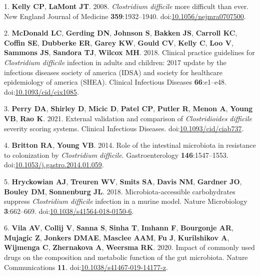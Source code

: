 \documentclass[
  12pt,
]{article}
\newenvironment{cslreferences}%
  {}%
  {\par}
\begin{document}
\hypertarget{refs}{}
\begin{cslreferences}
\leavevmode\hypertarget{ref-Kelly2008}{}%
1. \textbf{Kelly CP}, \textbf{LaMont JT}. 2008. \emph{Clostridium
difficile} more difficult than ever. New England Journal of Medicine
\textbf{359}:1932--1940.
doi:\href{https://doi.org/10.1056/nejmra0707500}{10.1056/nejmra0707500}.

\leavevmode\hypertarget{ref-McDonald2018}{}%
2. \textbf{McDonald LC}, \textbf{Gerding DN}, \textbf{Johnson S},
\textbf{Bakken JS}, \textbf{Carroll KC}, \textbf{Coffin SE},
\textbf{Dubberke ER}, \textbf{Garey KW}, \textbf{Gould CV},
\textbf{Kelly C}, \textbf{Loo V}, \textbf{Sammons JS}, \textbf{Sandora
TJ}, \textbf{Wilcox MH}. 2018. Clinical practice guidelines for
\emph{Clostridium difficile} infection in adults and children: 2017
update by the infectious diseases society of america (IDSA) and society
for healthcare epidemiology of america (SHEA). Clinical Infectious
Diseases \textbf{66}:e1--e48.
doi:\href{https://doi.org/10.1093/cid/cix1085}{10.1093/cid/cix1085}.

\leavevmode\hypertarget{ref-Perry2021}{}%
3. \textbf{Perry DA}, \textbf{Shirley D}, \textbf{Micic D},
\textbf{Patel CP}, \textbf{Putler R}, \textbf{Menon A}, \textbf{Young
VB}, \textbf{Rao K}. 2021. External validation and comparison of
\emph{Clostridioides difficile} severity scoring systems. Clinical
Infectious Diseases.
doi:\href{https://doi.org/10.1093/cid/ciab737}{10.1093/cid/ciab737}.

\leavevmode\hypertarget{ref-Britton2014}{}%
4. \textbf{Britton RA}, \textbf{Young VB}. 2014. Role of the intestinal
microbiota in resistance to colonization by \emph{Clostridium
difficile}. Gastroenterology \textbf{146}:1547--1553.
doi:\href{https://doi.org/10.1053/j.gastro.2014.01.059}{10.1053/j.gastro.2014.01.059}.

\leavevmode\hypertarget{ref-Hryckowian2018}{}%
5. \textbf{Hryckowian AJ}, \textbf{Treuren WV}, \textbf{Smits SA},
\textbf{Davis NM}, \textbf{Gardner JO}, \textbf{Bouley DM},
\textbf{Sonnenburg JL}. 2018. Microbiota-accessible carbohydrates
suppress \emph{Clostridium difficile} infection in a murine model.
Nature Microbiology \textbf{3}:662--669.
doi:\href{https://doi.org/10.1038/s41564-018-0150-6}{10.1038/s41564-018-0150-6}.

\leavevmode\hypertarget{ref-VichVila2020}{}%
6. \textbf{Vila AV}, \textbf{Collij V}, \textbf{Sanna S}, \textbf{Sinha
T}, \textbf{Imhann F}, \textbf{Bourgonje AR}, \textbf{Mujagic Z},
\textbf{Jonkers DMAE}, \textbf{Masclee AAM}, \textbf{Fu J},
\textbf{Kurilshikov A}, \textbf{Wijmenga C}, \textbf{Zhernakova A},
\textbf{Weersma RK}. 2020. Impact of commonly used drugs on the
composition and metabolic function of the gut microbiota. Nature
Communications \textbf{11}.
doi:\href{https://doi.org/10.1038/s41467-019-14177-z}{10.1038/s41467-019-14177-z}.


\end{cslreferences}
\end{document}
